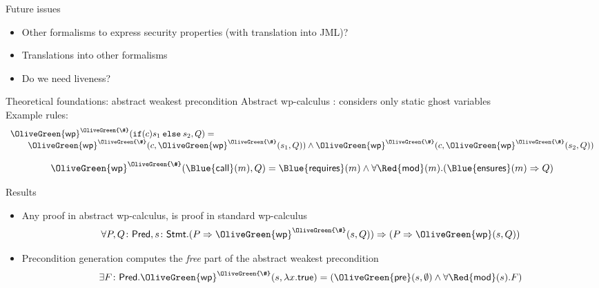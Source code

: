\documentclass[final,nocolorBG,a4,marieke,nototal,pdf, accumulate,slideColor]{prosper}
\begin{document}
\begin{slide}{Future issues}
\begin{itemize}
\item Other formalisms to express security properties (with
translation into JML)?
\item Translations into other formalisms
\item Do we need liveness?
\end{itemize}
\end{slide}

\begin{slide}{Theoretical foundations: abstract weakest precondition}
Abstract wp-calculus : considers only static 
ghost variables\\
Example rules:
\[
\begin{array}{l}
\mathsf{\OliveGreen{wp}}^{\OliveGreen{\#}}(\mathtt{if
(}c\mathtt{)}s_1\mathtt{\:else\:}s_2,Q) =\\
\qquad
\mathsf{\OliveGreen{wp}}^{\OliveGreen{\#}}(c, \mathsf{\OliveGreen{wp}}^{\OliveGreen{\#}}(s_1, Q)) \wedge
\mathsf{\OliveGreen{wp}}^{\OliveGreen{\#}}(c,
\mathsf{\OliveGreen{wp}}^{\OliveGreen{\#}}(s_2, Q))
\end{array}
\]

\[
\mathsf{\OliveGreen{wp}}^{\OliveGreen{\#}}(\mathsf{\Blue{call}}(m), Q) =
  \mathsf{\Blue{requires}}(m) \wedge 
  \forall \mathsf{\Red{mod}}(m). (\mathsf{\Blue{ensures}}(m) \Rightarrow Q)
\]
\end{slide}

\begin{slide}{Results}
\begin{itemize}
\item Any proof in abstract wp-calculus, is proof in standard
wp-calculus
\[
\forall P, Q\colon\mathsf{Pred}, s\colon\mathsf{Stmt}. 
(P \Rightarrow \mathsf{\OliveGreen{wp}}^{\OliveGreen{\#}}(s, Q)) \Rightarrow
               (P \Rightarrow \mathsf{\OliveGreen{wp}}(s, Q))
\]
\item Precondition generation computes the \emph{free} part of the
abstract weakest precondition
\[
\exists F\colon\mathsf{Pred}.  
             \mathsf{\OliveGreen{wp}}^{\OliveGreen{\#}}(s, \lambda x. \mathsf{true}) = 
             (\mathsf{\OliveGreen{pre}}(s, \emptyset) \wedge \forall
              \mathsf{\Red{mod}}(s). F) 
\]
\end{itemize}
\end{slide}
\end{document}
